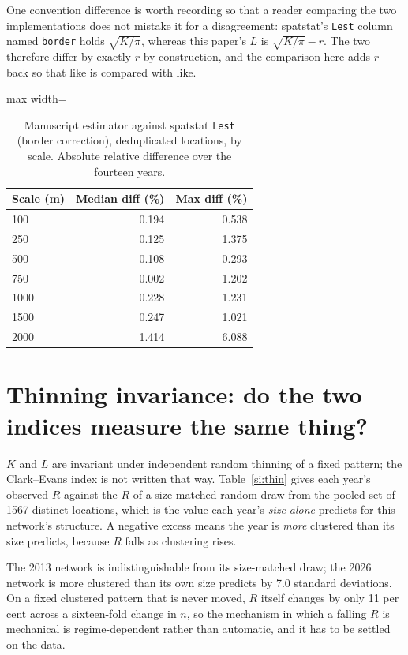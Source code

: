 \documentclass[fleqn,10pt]{wlpeerj}
\begin{document}
One convention difference is worth recording so that a reader comparing the two implementations
does not mistake it for a disagreement: \textsf{spatstat}'s \texttt{Lest} column named
\texttt{border} holds $\sqrt{K/\pi}$, whereas this paper's $L$ is $\sqrt{K/\pi} - r$. The two
therefore differ by exactly $r$ by construction, and the comparison here adds $r$ back so that
like is compared with like.

\begin{table}[H]
\centering
\caption{Manuscript estimator against \textsf{spatstat} \texttt{Lest} (border correction),
deduplicated locations, by scale. Absolute relative difference over the fourteen years.}
\label{si:xck}
\small
\begin{adjustbox}{max width=\linewidth}
\begin{tabular}{lrr}
\toprule
Scale (m) & Median diff (\%) & Max diff (\%) \\
\midrule
100 & 0.194 & 0.538 \\
250 & 0.125 & 1.375 \\
500 & 0.108 & 0.293 \\
750 & 0.002 & 1.202 \\
1000 & 0.228 & 1.231 \\
1500 & 0.247 & 1.021 \\
2000 & 1.414 & 6.088 \\
\bottomrule
\end{tabular}
\end{adjustbox}
\end{table}

\section{Thinning invariance: do the two indices measure the same thing?}
\label{si:thinning}

$K$ and $L$ are invariant under independent random thinning of a fixed pattern; the
Clark--Evans index is not written that way. Table~\ref{si:thin} gives each year's observed $R$
against the $R$ of a size-matched random draw from the pooled set of 1567 distinct
locations, which is the value each year's \emph{size alone} predicts for this network's
structure. A negative excess means the year is \emph{more} clustered than its size predicts,
because $R$ falls as clustering rises.

The 2013 network is indistinguishable from its size-matched draw; the 2026 network is more
clustered than its own size predicts by 7.0 standard deviations. On a fixed clustered
pattern that is never moved, $R$ itself changes by only 11 per cent across a
sixteen-fold change in $n$, so the mechanism in which a falling $R$ is mechanical is
regime-dependent rather than automatic, and it has to be settled on the data.
\end{document}
